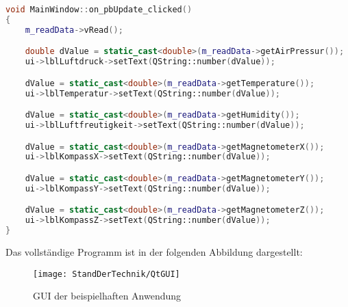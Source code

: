 \begin{lstlisting}[language=C++, caption=Slot Methode für den Update-Button,
    label=lst:updateSlot]
void MainWindow::on_pbUpdate_clicked()
{
    m_readData->vRead();

    double dValue = static_cast<double>(m_readData->getAirPressur());
    ui->lblLuftdruck->setText(QString::number(dValue));

    dValue = static_cast<double>(m_readData->getTemperature());
    ui->lblTemperatur->setText(QString::number(dValue));

    dValue = static_cast<double>(m_readData->getHumidity());
    ui->lblLuftfreutigkeit->setText(QString::number(dValue));

    dValue = static_cast<double>(m_readData->getMagnetometerX());
    ui->lblKompassX->setText(QString::number(dValue));

    dValue = static_cast<double>(m_readData->getMagnetometerY());
    ui->lblKompassY->setText(QString::number(dValue));

    dValue = static_cast<double>(m_readData->getMagnetometerZ());
    ui->lblKompassZ->setText(QString::number(dValue));
}

\end{lstlisting}

Das vollständige Programm ist in der folgenden Abbildung dargestellt:

\begin{figure}[h]
    \centering
    \texttt{[image: StandDerTechnik/QtGUI]}
    \caption[GUI der beispielhaften Anwendung]{GUI der beispielhaften Anwendung}
    \label{img:qtGui}
\end{figure}
